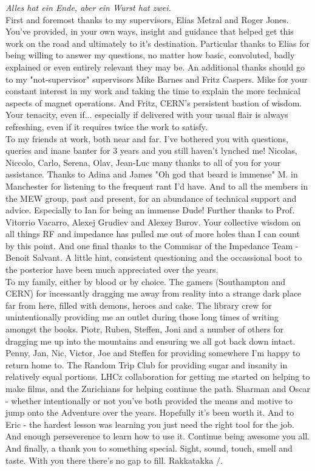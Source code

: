 \emph{Alles hat ein Ende, aber ein Wurst hat zwei.}
\\
First and foremost thanks to my supervisors, Elias Metral and Roger Jones. You've provided, in your own ways, insight and guidance that helped get this work on the road and ultimately to it's destination. Particular thanks to Elias for being willing to answer my questions, no matter how basic, convoluted, badly explained or even entirely relevant they may be. An additional thanks should go to my "not-supervisor" supervisors Mike Barnes and Fritz Caspers. Mike for your constant interest in my work and taking the time to explain the more technical aspects of magnet operations. And Fritz, CERN's persistent bastion of wisdom. Your tenacity, even if... especially if delivered with your usual flair is always refreshing, even if it requires twice the work to satisfy.
\\
To my friends at work, both near and far. I've bothered you with questions, queries and inane banter for 3 years and you still haven't lynched me! Nicolas, Niccolo, Carlo, Serena, Olav, Jean-Luc many thanks to all of you for your assistance. Thanks to Adina and James "Oh god that beard is immense" M. in Manchester for listening to the frequent rant I'd have. And to all the members in the MEW group, past and present, for an abundance of technical support and advice. Especially to Ian for being an immense Dude! Further thanks to Prof. Vitorrio Vacarro, Alexej Grudiev and Alexey Burov. Your collective wisdom on all things RF and impedance has pulled me out of more holes than I can count by this point. And one final thanks to the Commisar of the Impedance Team - Benoit Salvant. A little hint, consistent questioning and the occassional boot to the posterior have been much appreciated over the years.
\\
To my family, either by blood or by choice. The gamers (Southampton and CERN) for incessantly dragging me away from reality into a strange dark place far from here, filled with demons, heroes and cake. The library crew for unintentionally providing me an outlet during those long times of writing amongst the books. Piotr, Ruben, Steffen, Joni and a number of others for dragging me up into the mountains and ensuring we all got back down intact. Penny, Jan, Nic, Victor, Joe and Steffen for providing somewhere I'm happy to return home to. The Random Trip Club for providing sugar and insanity in relatively equal portions. LHCz collaboration for getting me started on helping to make films, and the Zurichians for helping continue the path. Sharman and Oscar - whether intentionally or not you've both provided the means and motive to jump onto the Adventure over the years. Hopefully it's been worth it. And to Eric - the hardest lesson was learning you just need the right tool for the job. And enough perseverence to learn how to use it. Continue being awesome you all.
\\
And finally, a thank you to something special. Sight, sound, touch, smell and taste. With you there there's no gap to fill. Rakkatakka \m/.
